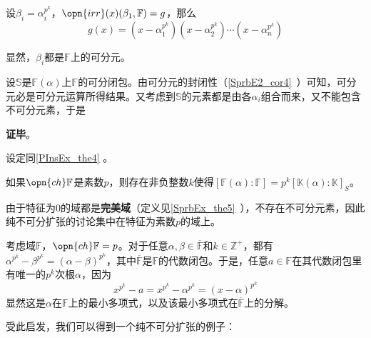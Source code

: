 设$\beta_i=\alpha_i^{p^k}$，$\opn{irr}(x)(\beta_1, \mathbb{F})=g$，那么
\begin{equation}
g(x) = (x-\alpha^{p^k}_1)(x-\alpha^{p^k}_2)\cdots(x-\alpha^{p^k}_n)
\end{equation}

显然，$\beta_i$都是$\mathbb{F}$上的可分元。

设$\mathbb{S}$是$\mathbb{F}(\alpha)$上$\mathbb{F}$的可分闭包。由可分元的封闭性（\autoref{SprbE2_cor4}~）可知，可分元必是可分元运算所得结果。又考虑到$\mathbb{S}$的元素都是由各$\alpha_i$组合而来，又不能包含不可分元素，于是

\textbf{证毕}。





\begin{corollary}{}
设定同\autoref{PInsEx_the4} 。

如果$\opn{ch}\mathbb{F}$是素数$p$，则存在非负整数$k$使得$[\mathbb{F}(\alpha):\mathbb{F}]=p^k[\mathbb{K}(\alpha):\mathbb{K}]_S$。
\end{corollary}



由于特征为$0$的域都是\textbf{完美域}（定义见\autoref{SprbEx_the5}~），不存在不可分元素，因此纯不可分扩张的讨论集中在特征为素数$p$的域上。

考虑域$\mathbb{F}$，$\opn{ch}\mathbb{F}=p$。对于任意$\alpha, \beta\in\overline{\mathbb{F}}$和$k\in\mathbb{Z}^+$，都有$\alpha^{p^k}-\beta^{p^k}=(\alpha-\beta)^{p^k}$，其中$\overline{\mathbb{F}}$是$\mathbb{F}$的代数闭包。于是，任意$a\in\mathbb{F}$在其代数闭包里有唯一的$p^k$次根$\alpha$，因为
\begin{equation}
x^{p^k}-a=x^{p^k}-\alpha^{p^k}=(x-\alpha)^{p^k}
\end{equation}
显然这是$\alpha$在$\mathbb{F}$上的最小多项式，以及该最小多项式在$\overline{\mathbb{F}}$上的分解。


受此启发，我们可以得到一个纯不可分扩张的例子：

